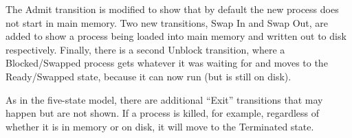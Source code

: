 The Admit transition is modified to show that by default the new process does not start in main memory. Two new transitions, Swap In and Swap Out, are added to show a process being loaded into main memory and written out to disk respectively. Finally, there is a second Unblock transition, where a Blocked/Swapped process gets whatever it was waiting for and moves to the Ready/Swapped state, because it can now run (but is still on disk).

As in the five-state model, there are additional ``Exit'' transitions that may happen but are not shown. If a process is killed, for example, regardless of whether it is in memory or on disk, it will move to the Terminated state.





